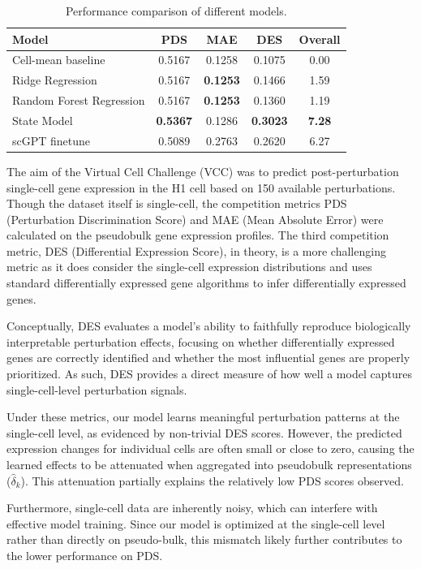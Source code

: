 \documentclass[conference]{IEEEtran}
\begin{document}
\begin{table}[t]
\caption{Performance comparison of different models.}
\label{tab:model_comparison}
\centering
\begin{tabular}{lcccc}
\hline
Model  & PDS & MAE & DES & Overall \\
\hline
Cell-mean baseline         & 0.5167 & 0.1258 & 0.1075 & 0.00 \\
Ridge Regression           & 0.5167 & \textbf{0.1253} & 0.1466 & 1.59 \\
Random Forest Regression  & 0.5167 & \textbf{0.1253}  & 0.1360 & 1.19 \\
State Model               & \textbf{0.5367} & 0.1286 & \textbf{0.3023 } & \textbf{7.28} \\
scGPT finetune             & 0.5089 & 0.2763 & 0.2620 & 6.27 \\
\hline
\end{tabular}
\end{table}

The aim of the Virtual Cell Challenge (VCC) was to predict post-perturbation single-cell gene expression in the H1 cell based on 150 available perturbations. Though the dataset itself is single-cell, the competition metrics PDS (Perturbation Discrimination Score) and MAE (Mean Absolute Error) were calculated on the pseudobulk gene expression profiles. The third competition metric, DES (Differential Expression Score), in theory, is a more challenging metric as it does consider the single-cell expression distributions and uses standard differentially expressed gene algorithms to infer differentially expressed genes. 

Conceptually, DES evaluates a model’s ability to faithfully reproduce biologically interpretable perturbation effects, focusing on whether differentially expressed genes are correctly identified and whether the most influential genes are properly prioritized. As such, DES provides a direct measure of how well a model captures single-cell-level perturbation signals.

Under these metrics, our model learns meaningful perturbation patterns at the single-cell level, as evidenced by non-trivial DES scores. However, the predicted expression changes for individual cells are often small or close to zero, causing the learned effects to be attenuated when aggregated into pseudobulk representations (\(\hat{\delta}_k\)). This attenuation partially explains the relatively low PDS scores observed.

Furthermore, single-cell data are inherently noisy, which can interfere with effective model training. Since our model is optimized at the single-cell level rather than directly on pseudo-bulk, this mismatch likely further contributes to the lower performance on PDS.
    
\end{document}
